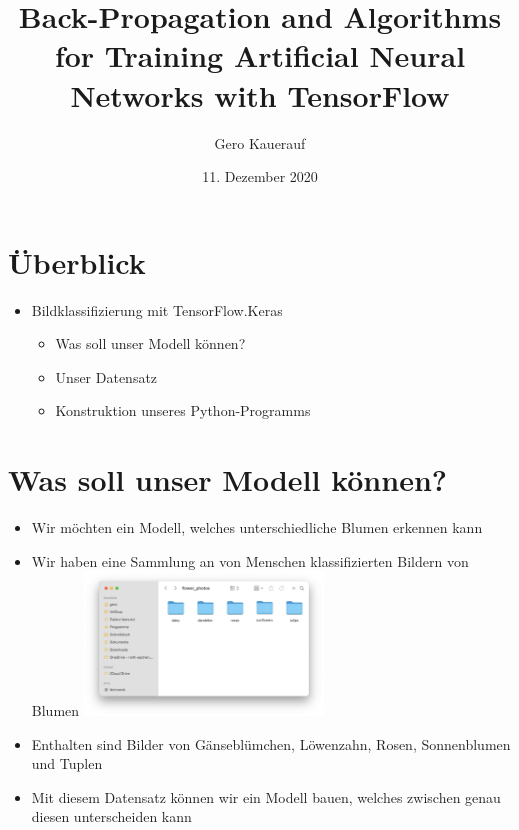 \documentclass[t]{beamer}
\begin{document}

\title{Back-Propagation and Algorithms for Training Artificial Neural Networks with TensorFlow}
\date{11. Dezember 2020}
\author{Gero Kauerauf}

\frame{\titlepage}

\section{Überblick}
\begin{frame}
    \begin{itemize}
        \item Bildklassifizierung mit TensorFlow.Keras
        \begin{itemize}
            \item Was soll unser Modell können?
            \item Unser Datensatz
            \item Konstruktion unseres Python-Programms
        \end{itemize}
    \end{itemize}
\end{frame}

\section{Was soll unser Modell können?}
\begin{frame}
    \begin{itemize}
        \item Wir möchten ein Modell, welches unterschiedliche Blumen erkennen kann
        \item Wir haben eine Sammlung an von Menschen klassifizierten Bildern von Blumen
        \includegraphics[width=0.5\textwidth]{teach-plots/flower-photos}
        \item Enthalten sind Bilder von Gänseblümchen, Löwenzahn, Rosen, Sonnenblumen und Tuplen
        \item Mit diesem Datensatz können wir ein Modell bauen, welches zwischen genau diesen unterscheiden kann
    \end{itemize}
\end{frame}
\end{document}
